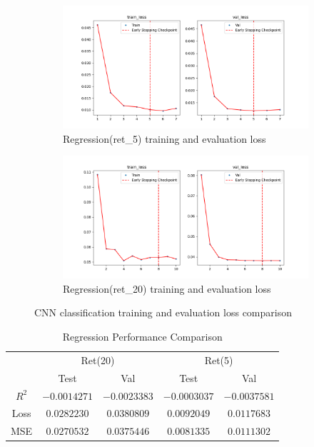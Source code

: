 \documentclass{article}
\begin{document}
\begin{figure}[H]
	\centering
	\begin{subfigure}[c]{0.49\linewidth}
		\centering
		\includegraphics[width=0.8\linewidth]{9_3 CNN regression(ret_5) training and evaluation loss.png}
		\caption*{Regression(ret\_5) training and evaluation loss}
	\end{subfigure}
	\hfill
	\begin{subfigure}[c]{0.49\linewidth}
		\centering
		\includegraphics[width=0.8\linewidth]{10_3 CNN regression(ret_20) training and evaluation loss.png}
		\caption*{Regression(ret\_20) training and evaluation loss}
	\end{subfigure}
	\caption{CNN classification training and evaluation loss comparison}
\end{figure}


\begin{table}[H] %
  \centering
  \caption{Regression Performance Comparison}
  \begin{tabular}{ccccc} %
    \toprule %
    & \multicolumn{2}{c}{Ret(20)} & \multicolumn{2}{c}{Ret(5)} \\
    \cmidrule(lr){2-3} \cmidrule(lr){4-5}
    & Test & Val & Test & Val \\
    \midrule %
    $R^2$ & $-0.0014271$ & $-0.0023383$ & $-0.0003037$ & $-0.0037581$ \\
    Loss & $0.0282230$ & $0.0380809$ & $0.0092049$ & $0.0117683$ \\ 
    MSE & $0.0270532$ & $0.0375446$ & $0.0081335$ & $0.0111302$ \\
    \bottomrule %
  \end{tabular}
\end{table}
\end{document}
